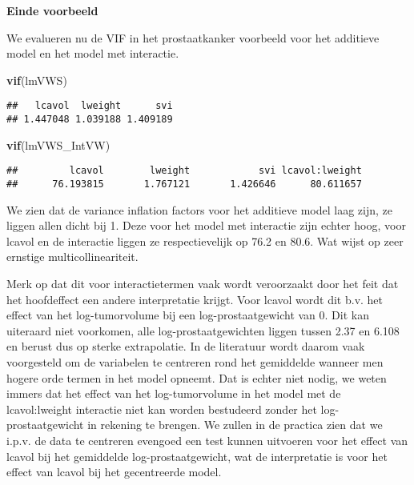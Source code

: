 \documentclass[
  12pt,dutch,coursenotes]{book}
\newenvironment{Shaded}{\begin{snugshade}}{\end{snugshade}}
\newcommand{\KeywordTok}[1]{\textcolor[rgb]{0.13,0.29,0.53}{\textbf{#1}}}
\newcommand{\NormalTok}[1]{#1}
\theoremstyle{definition}
\theoremstyle{definition}
\theoremstyle{definition}
\theoremstyle{remark}
\begin{document}
\textbf{Einde voorbeeld}

We evalueren nu de VIF in het prostaatkanker voorbeeld voor het additieve model en het model met interactie.

\begin{Shaded}
\begin{Highlighting}[]
\KeywordTok{vif}\NormalTok{(lmVWS)}
\end{Highlighting}
\end{Shaded}

\begin{verbatim}
##   lcavol  lweight      svi 
## 1.447048 1.039188 1.409189
\end{verbatim}

\begin{Shaded}
\begin{Highlighting}[]
\KeywordTok{vif}\NormalTok{(lmVWS\_IntVW)}
\end{Highlighting}
\end{Shaded}

\begin{verbatim}
##         lcavol        lweight            svi lcavol:lweight 
##      76.193815       1.767121       1.426646      80.611657
\end{verbatim}

We zien dat de variance inflation factors voor het additieve model laag zijn, ze liggen allen dicht bij 1.
Deze voor het model met interactie zijn echter hoog, voor lcavol en de interactie liggen ze respectievelijk op 76.2 en 80.6.
Wat wijst op zeer ernstige multicollineariteit.

Merk op dat dit voor interactietermen vaak wordt veroorzaakt door het feit dat het hoofdeffect een andere interpretatie krijgt. Voor lcavol wordt dit b.v. het effect van het log-tumorvolume bij een log-prostaatgewicht van 0. Dit kan uiteraard niet voorkomen, alle log-prostaatgewichten liggen tussen 2.37 en 6.108 en berust dus op sterke extrapolatie. In de literatuur wordt daarom vaak voorgesteld om de variabelen te centreren rond het gemiddelde wanneer men hogere orde termen in het model opneemt. Dat is echter niet nodig, we weten immers dat het effect van het log-tumorvolume in het model met de lcavol:lweight interactie niet kan worden bestudeerd zonder het log-prostaatgewicht in rekening te brengen.
We zullen in de practica zien dat we i.p.v. de data te centreren evengoed een test kunnen uitvoeren voor het effect van lcavol bij het gemiddelde log-prostaatgewicht, wat de interpretatie is voor het effect van lcavol bij het gecentreerde model.
\end{document}
